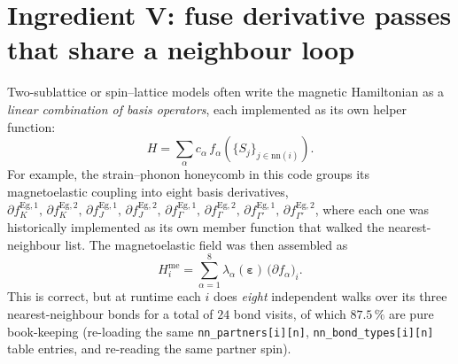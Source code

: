 \documentclass[11pt,letterpaper]{article}
\begin{document}
\section{Ingredient V: fuse derivative passes that share a neighbour
                       loop}
\label{sec:me-fuse}

Two-sublattice or spin--lattice models often write the magnetic
Hamiltonian as a \emph{linear combination of basis operators},
each implemented as its own helper function:
\[
   H = \sum_{\alpha} c_{\alpha}\, f_{\alpha}(\{S_j\}_{j \in \text{nn}(i)}) .
\]
For example, the strain--phonon honeycomb in this code groups its
magnetoelastic coupling into eight basis derivatives,
$\partial f^{\text{Eg},1}_{K},\,\partial f^{\text{Eg},2}_{K},\,
 \partial f^{\text{Eg},1}_{J},\,\partial f^{\text{Eg},2}_{J},\,
 \partial f^{\text{Eg},1}_{\Gamma},\,\partial f^{\text{Eg},2}_{\Gamma},\,
 \partial f^{\text{Eg},1}_{\Gamma'},\,\partial f^{\text{Eg},2}_{\Gamma'}$,
where each one was historically implemented as its own member function
that walked the nearest-neighbour list.  The magnetoelastic field was
then assembled as
\[
   H^{\text{me}}_i = \sum_{\alpha=1}^{8} \lambda_{\alpha}(\boldsymbol{\varepsilon})\,
                     \big(\partial f_{\alpha}\big)_i .
\]
This is correct, but at runtime each $i$ does \emph{eight} independent
walks over its three nearest-neighbour bonds for a total of $24$ bond
visits, of which $87.5\,\%$ are pure book-keeping (re-loading the same
\texttt{nn\_partners[i][n]}, \texttt{nn\_bond\_types[i][n]} table
entries, and re-reading the same partner spin).
\end{document}
